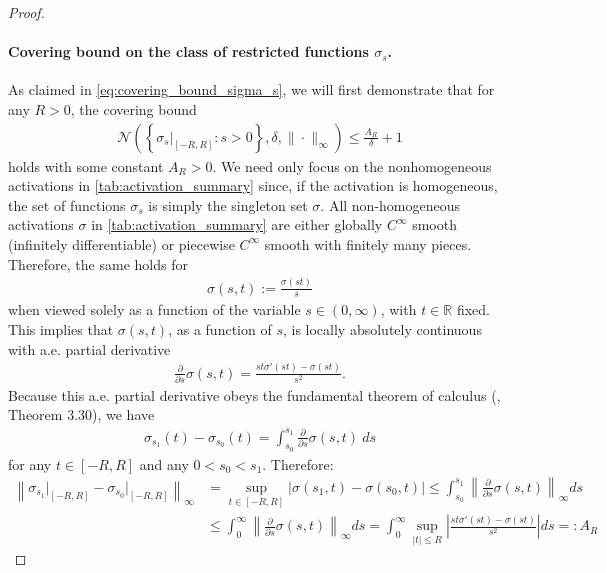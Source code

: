 \documentclass{article}
\def\cN{{\mathcal{N}}}
\newcommand{\R}{\mathbb{R}}
\begin{document}
\begin{appendices}
\begin{proof}
    \paragraph{Covering bound on the class of restricted functions $\sigma_s$.} As claimed in \eqref{eq:covering_bound_sigma_s}, we will first demonstrate that for any $R > 0$, the covering bound
    \begin{align} \label{eq:covering_bound_sigma_s}
        \cN \left( \left\{ \sigma_s \big\rvert_{[-R,R]} : s > 0 \right\}, \delta, \| \cdot \|_\infty \right) \leq \frac{A_R}{\delta} + 1
    \end{align}
    holds with some constant $A_R > 0$. We need only focus on the nonhomogeneous activations in \cref{tab:activation_summary} since, if the activation is homogeneous, the set of functions $\sigma_s$ is simply the singleton set $\sigma$. All non-homogeneous activations $\sigma$ in \cref{tab:activation_summary} are either globally $C^\infty$ smooth (infinitely differentiable) or piecewise $C^\infty$ smooth with finitely many pieces. Therefore, the same holds for
    \begin{align}
        \sigma(s,t) := \frac{\sigma(st)}{s}
    \end{align}
    when viewed solely as a function of the variable $s \in (0,\infty)$, with $t \in \R$ fixed. This implies that $\sigma(s,t)$, as a function of $s$, is locally absolutely continuous with a.e. partial derivative
    \begin{align}
        \frac{\partial}{\partial s} \sigma(s,t) = \frac{st \sigma'(st) - \sigma(st)}{s^2}.
    \end{align}
    Because this a.e. partial derivative obeys the fundamental theorem of calculus (\cite{leoni2017first}, Theorem 3.30), we have
    \begin{align}
        \sigma_{s_1} (t) - \sigma_{s_0}(t) = \int_{s_0}^{s_1} \frac{\partial}{\partial s} \sigma(s,t) \ ds
    \end{align}
    for any $t \in [-R,R]$ and any $0 < s_0 < s_1$. Therefore:
    \begin{align}
        \left\| \sigma_{s_1} \big\rvert_{[-R,R]} - \sigma_{s_0} \big\rvert_{[-R,R]} \right\|_\infty &= \sup_{t \in [-R,R]} |\sigma(s_1,t) - \sigma(s_0,t) | \leq \int_{s_0}^{s_1} \left\| \frac{\partial}{\partial s} \sigma(s,t) \right\|_\infty ds \\
        &\leq  \int_0^\infty \left\| \frac{\partial}{\partial s} \sigma(s,t) \right\|_\infty ds =   \int_0^\infty \sup_{|t| \leq R} \left| \frac{st \sigma'(st) - \sigma(st)}{s^2} \right| ds =: A_R \label{eq:AR_def}

\end{align}
\end{proof}
\end{appendices}
\end{document}
